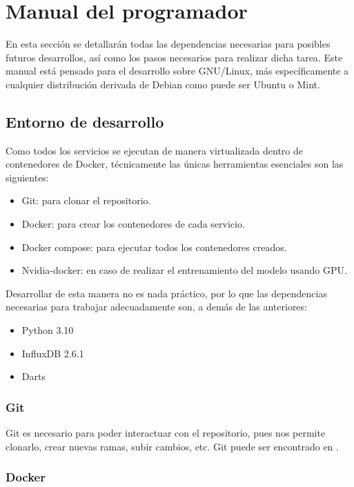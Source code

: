 \section{Manual del programador}

En esta sección se detallarán todas las dependencias necesarias para posibles futuros desarrollos, así como
los pasos necesarios para realizar dicha tarea. Este manual está pensado para el desarrollo sobre GNU/Linux,
más específicamente a cualquier distribución derivada de Debian como puede ser Ubuntu o Mint.

\subsection{Entorno de desarrollo}

Como todos los servicios se ejecutan de manera virtualizada dentro de contenedores de Docker, técnicamente las 
únicas herramientas esenciales son las siguientes:
\begin{itemize}
    \item Git: para clonar el repositorio.
    \item Docker: para crear los contenedores de cada servicio.
    \item Docker compose: para ejecutar todos los contenedores creados.
    \item Nvidia-docker: en caso de realizar el entrenamiento del modelo usando GPU.
\end{itemize}

Desarrollar de esta manera no es nada práctico, por lo que las dependencias necesarias para trabajar adecuadamente son, 
a demás de las anteriores:
\begin{itemize}
    \item Python 3.10
    \item InfluxDB 2.6.1
    \item Darts
\end{itemize}

\subsubsection{Git}

Git es necesario para poder interactuar con el repositorio, pues nos permite clonarlo, crear nuevas ramas,
subir cambios, etc. Git puede ser encontrado en \cite{git}.


\subsubsection{Docker}

